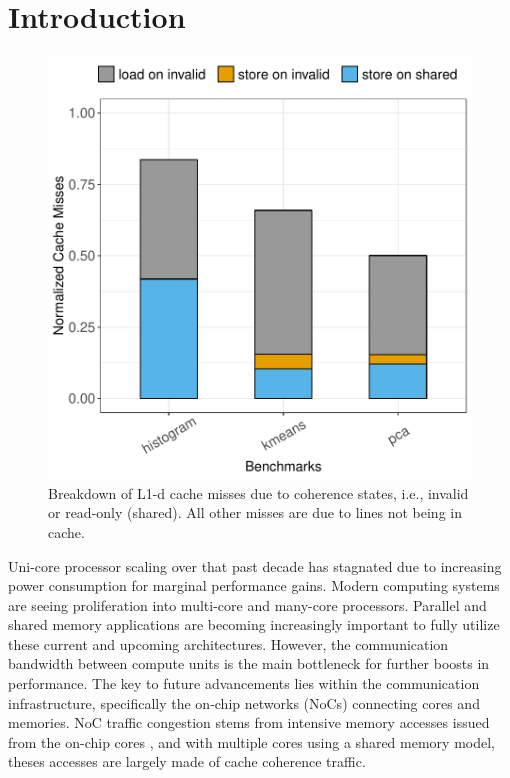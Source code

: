 \section{Introduction}

\begin{figure}[htbp]
	\centerline{\includegraphics[scale=0.5]{graphs/normalized_cache_misses.pdf}}
	\caption{Breakdown of L1-d cache misses due to coherence states, i.e., invalid or read-only (shared). All other misses are due to lines not being in cache.}
\label{fig:coherence_misses}
\end{figure}


Uni-core processor scaling over that past decade has stagnated due to increasing power consumption for marginal performance gains. Modern computing systems are seeing proliferation into multi-core and many-core processors. Parallel and shared memory applications are becoming increasingly important to fully utilize these current and upcoming architectures. However, the communication bandwidth between compute units is the main bottleneck for further boosts in performance. The key to future advancements lies within the communication infrastructure, specifically the on-chip networks (NoCs) connecting cores and memories. NoC traffic congestion stems from intensive memory accesses issued from the on-chip cores \cite{Wang2008}, and with multiple cores using a shared memory model, theses accesses are largely made of cache coherence traffic.

